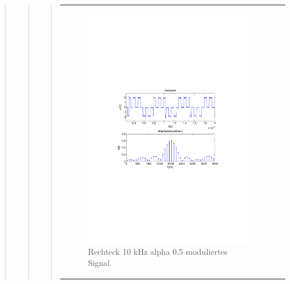 \begin{quote}
\begin{quote}
\begin{quote}
\begin{center}
\begin{tabular}{ll}
            \hspace{-5cm}
                \begin{minipage}{0.6\textwidth}
                    \begin{figure}[H]
                        \includegraphics[scale=0.55, trim = 16mm 70mm 16mm 85mm, clip]{Bilder/shaperec10_05abget_zeit}
                          \caption{Rechteck 10 kHz alpha 0,5 moduliertes Signal}
		                  \label{fig:shaperec10_05zeit}
                    \end{figure}
                \end{minipage}
                

\end{tabular}
\end{center}
\end{quote}
\end{quote}
\end{quote}
